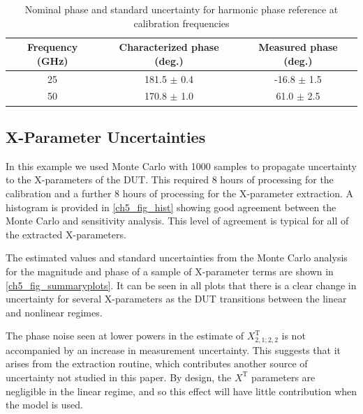 \documentclass[../thesis/thesis.tex]{subfiles}
\begin{document}
\begin{refsection}
\begin{table}[]
	\centering
	\caption{Nominal phase and standard uncertainty for harmonic phase reference at calibration frequencies}
	\label{ch5_table_phaseunc}
	\begin{tabular}{ccc}
		\hline
		Frequency (GHz) & Characterized phase (deg.) & Measured phase (deg.)\\ \hline
		25 & 181.5 $\pm$ 0.4 & -16.8 $\pm$ 1.5 \\ 
		50 & 170.8 $\pm$ 1.0 & 61.0 $\pm$ 2.5 \\ 
		\hline
	\end{tabular}
\end{table}

\subsection{X-Parameter Uncertainties}

In this example we used Monte Carlo with 1000 samples to propagate uncertainty to the X-parameters of the DUT. This required 8 hours of processing for the calibration and a further 8 hours of processing for the X-parameter extraction.
A histogram is provided in \figurename{ \ref{ch5_fig_hist}} showing good agreement between the Monte Carlo and sensitivity analysis. This level of agreement is typical for all of the extracted X-parameters.

The estimated values and standard uncertainties from the Monte Carlo analysis for the magnitude and phase of a sample of X-parameter terms are shown in \figurename{ \ref{ch5_fig_summaryplots}}. It can be seen in all plots that there is a clear change in uncertainty for several X-parameters as the DUT transitions between the linear and nonlinear regimes.

The phase noise seen at lower powers in the estimate of $X^\textrm{T}_{2,1;2,2}$ is not accompanied by an increase in measurement uncertainty. This suggests that it arises from the extraction routine, which contributes another source of uncertainty not studied in this paper. By design, the $X^\textrm{T}$ parameters are negligible in the linear regime, and so this effect will have little contribution when the model is used.


\end{refsection}
\end{document}
